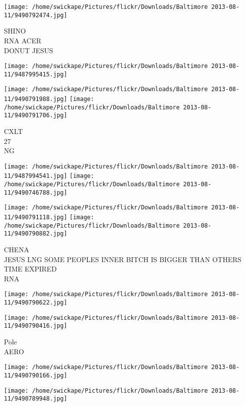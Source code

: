 \documentclass[10pt,letterpaper]{article}
\begin{document}
\texttt{[image: /home/swickape/Pictures/flickr/Downloads/Baltimore 2013-08-11/9490792474.jpg]}

SHINO\\
RNA ACER\\
DONUT JESUS\\
\pagebreak

\texttt{[image: /home/swickape/Pictures/flickr/Downloads/Baltimore 2013-08-11/9487995415.jpg]}

\vspace{0.25in}
\texttt{[image: /home/swickape/Pictures/flickr/Downloads/Baltimore 2013-08-11/9490791988.jpg]}
\texttt{[image: /home/swickape/Pictures/flickr/Downloads/Baltimore 2013-08-11/9490791706.jpg]}

CXLT\\
27\\
NG\\
\pagebreak

\texttt{[image: /home/swickape/Pictures/flickr/Downloads/Baltimore 2013-08-11/9487994541.jpg]}
\texttt{[image: /home/swickape/Pictures/flickr/Downloads/Baltimore 2013-08-11/9490746788.jpg]}

\texttt{[image: /home/swickape/Pictures/flickr/Downloads/Baltimore 2013-08-11/9490791118.jpg]}
\texttt{[image: /home/swickape/Pictures/flickr/Downloads/Baltimore 2013-08-11/9490790882.jpg]}

CHENA\\
JESUS LNG SOME PEOPLES INNER BITCH IS BIGGER THAN OTHERS\\
TIME EXPIRED\\
RNA\\
\pagebreak

\texttt{[image: /home/swickape/Pictures/flickr/Downloads/Baltimore 2013-08-11/9490790622.jpg]}

\vspace{0.25in}
\texttt{[image: /home/swickape/Pictures/flickr/Downloads/Baltimore 2013-08-11/9490790416.jpg]}

Pole\\
AERO\\
\pagebreak

\texttt{[image: /home/swickape/Pictures/flickr/Downloads/Baltimore 2013-08-11/9490790166.jpg]}

\vspace{0.25in}
\texttt{[image: /home/swickape/Pictures/flickr/Downloads/Baltimore 2013-08-11/9490789948.jpg]}
\end{document}
